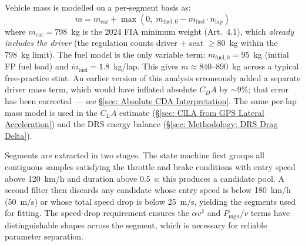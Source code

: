 Vehicle mass is modelled on a per-segment basis as:
\begin{equation}
    m = m_\text{car} + \max\!\left(0,\; m_{\text{fuel},0} - \dot{m}_\text{fuel}\cdot n_\text{lap}\right)
\end{equation}
where $m_\text{car} = 798$~kg is the 2024 FIA minimum weight (Art.~4.1), which \emph{already includes the driver} (the regulation counts driver $+$ seat $\geq 80$~kg within the 798~kg limit). The fuel model is the only variable term: $m_{\text{fuel},0} = 95$~kg (initial FP fuel load) and $\dot{m}_\text{fuel} = 1.8$~kg/lap. This gives $m \approx 840$--$890$~kg across a typical free-practice stint. An earlier version of this analysis erroneously added a separate driver mass term, which would have inflated absolute $C_DA$ by $\sim\!9\%$; that error has been corrected --- see \S\ref{sec: Absolute CDA Interpretation}. The same per-lap mass model is used in the $C_LA$ estimate (\S\ref{sec: ClLA from GPS Lateral Acceleration}) and the DRS energy balance (\S\ref{sec: Methodology; DRS Drag Delta}).

Segments are extracted in two stages. The state machine first groups all contiguous samples satisfying the throttle and brake conditions with entry speed above 120~km/h and duration above 0.5~s; this produces a candidate pool. A second filter then discards any candidate whose entry speed is below 180~km/h (50~m/s) or whose total speed drop is below 25~m/s, yielding the segments used for fitting. The speed-drop requirement ensures the $\alpha v^2$ and $P_\text{mgu}/v$ terms have distinguishable shapes across the segment, which is necessary for reliable parameter separation.

